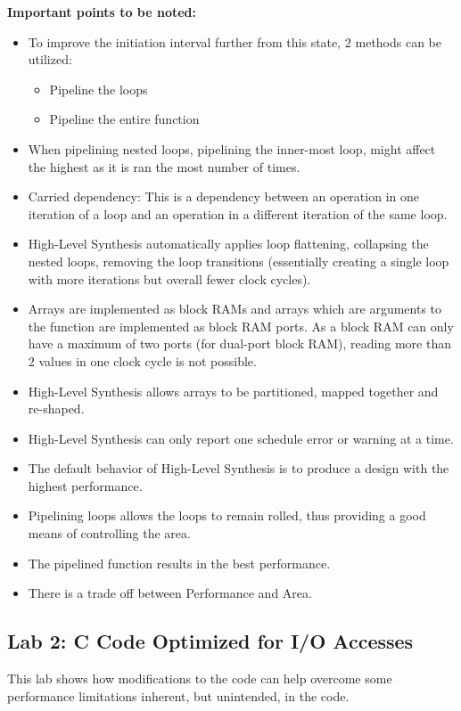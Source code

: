 {\bf Important points to be noted:
\begin{itemize}
    \item To improve the initiation interval further from this state, 2 methods can be utilized: 
    \begin{itemize}
        \item Pipeline the loops
        \item Pipeline the entire function
    \end{itemize}
    \item When pipelining nested loops, pipelining the inner-most loop, might affect the highest as it is ran the most number of times. 
    \item Carried dependency: This is a dependency between an operation in one iteration of a loop and an operation in a different iteration of the same loop.
    \item High-Level Synthesis automatically applies loop flattening, collapsing the nested loops, removing the loop transitions (essentially creating a
    single loop with more iterations but overall fewer clock cycles).
    \item Arrays are implemented as block RAMs and arrays which are arguments to the function are implemented as block RAM ports. As a block RAM can only have a maximum of two ports (for dual-port block RAM), reading more than 2 values in one clock cycle is not possible.
    \item High-Level Synthesis allows arrays to be partitioned, mapped together and re-shaped.
    \item High-Level Synthesis can only report one schedule error or warning at a time.
    \item The default behavior of High-Level Synthesis is to produce a design with the
    highest performance.
    \item Pipelining loops allows the loops to remain rolled, thus providing a good means of
    controlling the area.
    \item The pipelined function results in the best performance.
    \item There is a trade off between Performance and Area.
\end{itemize}
}

\subsection{Lab 2: C Code Optimized for I/O Accesses}
This lab shows how modifications to the code can help overcome some performance limitations inherent, but unintended, in the code.

